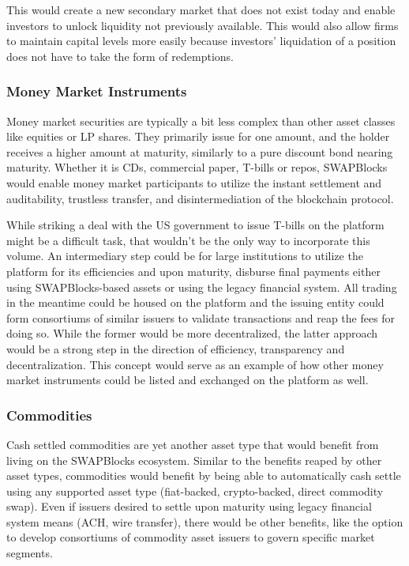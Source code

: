 \documentclass[12pt]{article}
\begin{document}
This would create a new secondary market that does not exist today and enable investors to unlock liquidity not 
previously available. This would also allow firms to maintain capital levels more easily because investors’ 
liquidation of a position does not have to take the form of redemptions.

\subsubsection{Money Market Instruments}

Money market securities are typically a bit less complex than other asset classes like equities or LP shares. They 
primarily issue for one amount, and the holder receives a higher amount at maturity, similarly to a pure discount 
bond nearing maturity. Whether it is CDs, commercial paper, T-bills or repos, SWAPBlocks would enable money market 
participants to utilize the instant settlement and auditability, trustless transfer, and disintermediation of 
the blockchain protocol.

While striking a deal with the US government to issue T-bills on the platform might be a difficult task, that 
wouldn’t be the only way to incorporate this volume. An intermediary step could be for large institutions to 
utilize the platform for its efficiencies and upon maturity, disburse final payments either using SWAPBlocks-based 
assets or using the legacy financial system. All trading in the meantime could be housed on the platform and the 
issuing entity could form consortiums of similar issuers to validate transactions and reap the fees for doing so. 
While the former would be more decentralized, the latter approach would be a strong step in the direction of 
efficiency, transparency and decentralization. This concept would serve as an example of how other money market 
instruments could be listed and exchanged on the platform as well.

\subsubsection{Commodities}
Cash settled commodities are yet another asset type that would benefit from living on the SWAPBlocks ecosystem. 
Similar to the benefits reaped by other asset types, commodities would benefit by being able to automatically cash 
settle using any supported asset type (fiat-backed, crypto-backed, direct commodity swap). Even if issuers desired 
to settle upon maturity using legacy financial system means (ACH, wire transfer), there would be other benefits, 
like the option to develop consortiums of commodity asset issuers to govern specific market segments.
\end{document}
